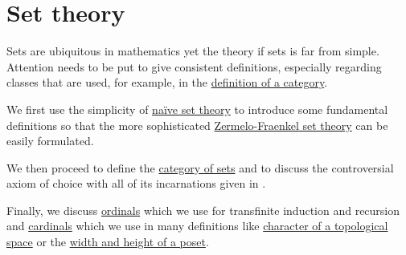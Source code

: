 \section{Set theory}\label{sec:set_theory}

Sets are ubiquitous in mathematics yet the theory if sets is far from simple. Attention needs to be put to give consistent definitions, especially regarding classes that are used, for example, in the \hyperref[def:category]{definition of a category}.

We first use the simplicity of \hyperref[def:naive_set_theory]{na\"ive set theory} to introduce some fundamental definitions so that the more sophisticated \hyperref[def:zfc]{Zermelo-Fraenkel set theory} can be easily formulated.

We then proceed to define the \hyperref[def:category_of_sets]{category of sets} and to discuss the controversial axiom of choice with all of its incarnations given in .

Finally, we discuss \hyperref[def:ordinal]{ordinals} which we use for transfinite induction and recursion and \hyperref[def:cardinal]{cardinals} which we use in many definitions like \hyperref[def:topological_space_character]{character of a topological space} or the \hyperref[def:poset_chain_and_antichain]{width and height of a poset}.

